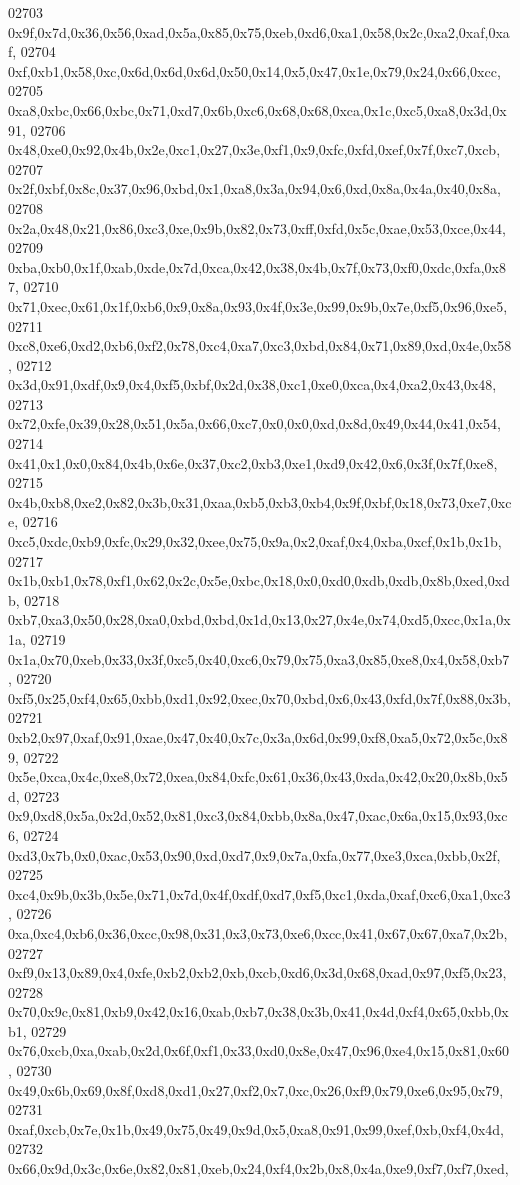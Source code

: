 \begin{DoxyCode}
02703   0x9f,0x7d,0x36,0x56,0xad,0x5a,0x85,0x75,0xeb,0xd6,0xa1,0x58,0x2c,0xa2,0xaf,0xaf,
02704   0xf,0xb1,0x58,0xc,0x6d,0x6d,0x6d,0x50,0x14,0x5,0x47,0x1e,0x79,0x24,0x66,0xcc,
02705   0xa8,0xbc,0x66,0xbc,0x71,0xd7,0x6b,0xc6,0x68,0x68,0xca,0x1c,0xc5,0xa8,0x3d,0x91,
02706   0x48,0xe0,0x92,0x4b,0x2e,0xc1,0x27,0x3e,0xf1,0x9,0xfc,0xfd,0xef,0x7f,0xc7,0xcb,
02707   0x2f,0xbf,0x8c,0x37,0x96,0xbd,0x1,0xa8,0x3a,0x94,0x6,0xd,0x8a,0x4a,0x40,0x8a,
02708   0x2a,0x48,0x21,0x86,0xc3,0xe,0x9b,0x82,0x73,0xff,0xfd,0x5c,0xae,0x53,0xce,0x44,
02709   0xba,0xb0,0x1f,0xab,0xde,0x7d,0xca,0x42,0x38,0x4b,0x7f,0x73,0xf0,0xdc,0xfa,0x87,
02710   0x71,0xec,0x61,0x1f,0xb6,0x9,0x8a,0x93,0x4f,0x3e,0x99,0x9b,0x7e,0xf5,0x96,0xe5,
02711   0xc8,0xe6,0xd2,0xb6,0xf2,0x78,0xc4,0xa7,0xc3,0xbd,0x84,0x71,0x89,0xd,0x4e,0x58,
02712   0x3d,0x91,0xdf,0x9,0x4,0xf5,0xbf,0x2d,0x38,0xc1,0xe0,0xca,0x4,0xa2,0x43,0x48,
02713   0x72,0xfe,0x39,0x28,0x51,0x5a,0x66,0xc7,0x0,0x0,0xd,0x8d,0x49,0x44,0x41,0x54,
02714   0x41,0x1,0x0,0x84,0x4b,0x6e,0x37,0xc2,0xb3,0xe1,0xd9,0x42,0x6,0x3f,0x7f,0xe8,
02715   0x4b,0xb8,0xe2,0x82,0x3b,0x31,0xaa,0xb5,0xb3,0xb4,0x9f,0xbf,0x18,0x73,0xe7,0xce,
02716   0xc5,0xdc,0xb9,0xfc,0x29,0x32,0xee,0x75,0x9a,0x2,0xaf,0x4,0xba,0xcf,0x1b,0x1b,
02717   0x1b,0xb1,0x78,0xf1,0x62,0x2c,0x5e,0xbc,0x18,0x0,0xd0,0xdb,0xdb,0x8b,0xed,0xdb,
02718   0xb7,0xa3,0x50,0x28,0xa0,0xbd,0xbd,0x1d,0x13,0x27,0x4e,0x74,0xd5,0xcc,0x1a,0x1a,
02719   0x1a,0x70,0xeb,0x33,0x3f,0xc5,0x40,0xc6,0x79,0x75,0xa3,0x85,0xe8,0x4,0x58,0xb7,
02720   0xf5,0x25,0xf4,0x65,0xbb,0xd1,0x92,0xec,0x70,0xbd,0x6,0x43,0xfd,0x7f,0x88,0x3b,
02721   0xb2,0x97,0xaf,0x91,0xae,0x47,0x40,0x7c,0x3a,0x6d,0x99,0xf8,0xa5,0x72,0x5c,0x89,
02722   0x5e,0xca,0x4c,0xe8,0x72,0xea,0x84,0xfc,0x61,0x36,0x43,0xda,0x42,0x20,0x8b,0x5d,
02723   0x9,0xd8,0x5a,0x2d,0x52,0x81,0xc3,0x84,0xbb,0x8a,0x47,0xac,0x6a,0x15,0x93,0xc6,
02724   0xd3,0x7b,0x0,0xac,0x53,0x90,0xd,0xd7,0x9,0x7a,0xfa,0x77,0xe3,0xca,0xbb,0x2f,
02725   0xc4,0x9b,0x3b,0x5e,0x71,0x7d,0x4f,0xdf,0xd7,0xf5,0xc1,0xda,0xaf,0xc6,0xa1,0xc3,
02726   0xa,0xc4,0xb6,0x36,0xcc,0x98,0x31,0x3,0x73,0xe6,0xcc,0x41,0x67,0x67,0xa7,0x2b,
02727   0xf9,0x13,0x89,0x4,0xfe,0xb2,0xb2,0xb,0xcb,0xd6,0x3d,0x68,0xad,0x97,0xf5,0x23,
02728   0x70,0x9c,0x81,0xb9,0x42,0x16,0xab,0xb7,0x38,0x3b,0x41,0x4d,0xf4,0x65,0xbb,0xb1,
02729   0x76,0xcb,0xa,0xab,0x2d,0x6f,0xf1,0x33,0xd0,0x8e,0x47,0x96,0xe4,0x15,0x81,0x60,
02730   0x49,0x6b,0x69,0x8f,0xd8,0xd1,0x27,0xf2,0x7,0xc,0x26,0xf9,0x79,0xe6,0x95,0x79,
02731   0xaf,0xcb,0x7e,0x1b,0x49,0x75,0x49,0x9d,0x5,0xa8,0x91,0x99,0xef,0xb,0xf4,0x4d,
02732   0x66,0x9d,0x3c,0x6e,0x82,0x81,0xeb,0x24,0xf4,0x2b,0x8,0x4a,0xe9,0xf7,0xf7,0xed,

\end{DoxyCode}
